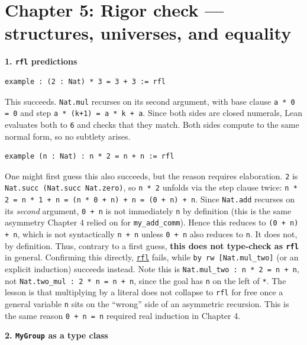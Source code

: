 \section{Chapter 5: Rigor check --- structures, universes, and equality}\label{sec:14-appendix-solutions:04-chapter-5:1}

\textbf{1. \texttt{rfl} predictions}

\begin{lstlisting}
example : (2 : Nat) * 3 = 3 + 3 := rfl
\end{lstlisting}

This succeeds. \texttt{Nat.mul} recurses on its second argument, with base clause \texttt{a * 0 = 0} and step \texttt{a * (k+1) = a * k + a}. Since both sides are closed numerals, Lean evaluates both to \texttt{6} and checks that they match. Both sides compute to the same normal form, so no subtlety arises.

\begin{lstlisting}
example (n : Nat) : n * 2 = n + n := rfl
\end{lstlisting}

One might first guess this also succeeds, but the reason requires elaboration. \texttt{2} is \texttt{Nat.succ (Nat.succ Nat.zero)}, so \texttt{n * 2} unfolds via the step clause twice: \texttt{n * 2 = n * 1 + n = (n * 0 + n) + n = (0 + n) + n}. Since \texttt{Nat.add} recurses on its \emph{second} argument, \texttt{0 + n} is not immediately \texttt{n} by definition (this is the same asymmetry Chapter 4 relied on for \texttt{my\_\allowbreak{}add\_\allowbreak{}comm}). Hence this reduces to \texttt{(0 + n) + n}, which is not syntactically \texttt{n + n} unless \texttt{0 + n} also reduces to \texttt{n}. It does not, by definition. Thus, contrary to a first guess, \textbf{this does not type-check as \texttt{rfl}} in general. Confirming this directly, \href{https://lean-lang.org/doc/reference/latest/Tactic-Proofs/Tactic-Reference/}{\texttt{rfl}} fails, while \texttt{by rw [Nat.mul\_\allowbreak{}two]} (or an explicit induction) succeeds instead. Note this is \texttt{Nat.mul\_\allowbreak{}two : n * 2 = n + n}, not \texttt{Nat.two\_\allowbreak{}mul : 2 * n = n + n}, since the goal has \texttt{n} on the left of \texttt{*}. The lesson is that multiplying by a literal does not collapse to \texttt{rfl} for free once a general variable \texttt{n} sits on the ``wrong'' side of an asymmetric recursion. This is the same reason \texttt{0 + n = n} required real induction in Chapter 4.

\textbf{2. \texttt{MyGroup} as a type class}

